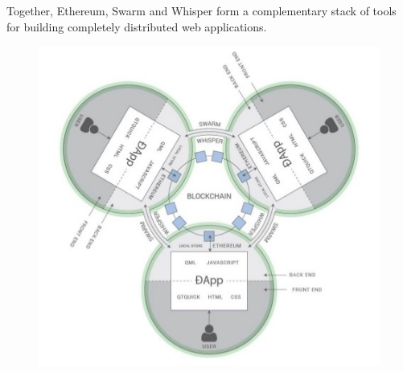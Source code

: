 Together, Ethereum, Swarm and Whisper form a complementary stack of tools for building completely distributed web applications.\\ 
\begin{figure}
\centering
\includegraphics[width=\textwidth]{Figures/DappArch}
\decoRule
\caption[]{}
\label{fig:DappArch}
\end{figure}

